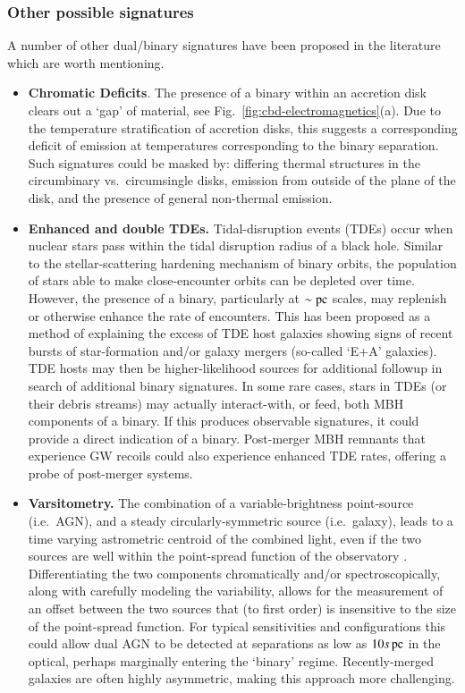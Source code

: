 \documentclass[onecolumn,authoryear]{els-mrw}
\begin{document}
\subsubsection{Other possible signatures}\label{sec:ems_other}

A number of other dual/binary signatures have been proposed in the literature which are worth mentioning.
\begin{itemize}
    \item \textbf{Chromatic Deficits}.  The presence of a binary within an accretion disk clears out a `gap' of material, see Fig.~\ref{fig:cbd-electromagnetics}(a).  Due to the temperature stratification of accretion disks, this suggests a corresponding deficit of emission at temperatures corresponding to the binary separation.  Such signatures could be masked by: differing thermal structures in the circumbinary vs.~circumsingle disks, emission from outside of the plane of the disk, and the presence of general non-thermal emission.
    \item \textbf{Enhanced and double TDEs.}  Tidal-disruption events (TDEs) occur when nuclear stars pass within the tidal disruption radius of a black hole.  Similar to the stellar-scattering hardening mechanism of binary orbits, the population of stars able to make close-encounter orbits can be depleted over time.  However, the presence of a binary, particularly at $\sim \mathrm{pc}$ scales, may replenish or otherwise enhance the rate of encounters.  This has been proposed as a method of explaining the excess of TDE host galaxies showing signs of recent bursts of star-formation and/or galaxy mergers (so-called `E+A' galaxies).  TDE hosts may then be higher-likelihood sources for additional followup in search of additional binary signatures.  In some rare cases, stars in TDEs (or their debris streams) may actually interact-with, or feed, both MBH components of a binary.  If this produces observable signatures, it could provide a direct indication of a binary.  Post-merger MBH remnants that experience GW recoils could also experience enhanced TDE rates, offering a probe of post-merger systems.
    \item \textbf{Varsitometry.} The combination of a variable-brightness point-source (i.e.~AGN), and a steady circularly-symmetric source (i.e.~galaxy), leads to a time varying astrometric centroid of the combined light, even if the two sources are well within the point-spread function of the observatory \citep{Shen+2019}.  Differentiating the two components chromatically and/or spectroscopically, along with carefully modeling the variability, allows for the measurement of an offset between the two sources that (to first order) is insensitive to the size of the point-spread function.  For typical sensitivities and configurations this could allow dual AGN to be detected at separations as low as $10s \, \mathrm{pc}$ in the optical, perhaps marginally entering the `binary' regime.  Recently-merged galaxies are often highly asymmetric, making this approach more challenging.

\end{itemize}
\end{document}
